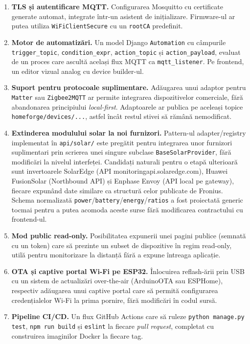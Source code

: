 \begin{enumerate}
    \item \textbf{TLS și autentificare MQTT.} Configurarea Mosquitto cu certificate generate automat, integrate într-un asistent de inițializare. Firmware-ul ar putea utiliza \texttt{WiFiClientSecure} cu un \texttt{rootCA} predefinit.
    \item \textbf{Motor de automatizări.} Un model Django \texttt{Automation} cu câmpurile \texttt{trigger\_topic}, \texttt{condition\_expr}, \texttt{action\_topic} și \texttt{action\_payload}, evaluat de un proces care ascultă același flux MQTT ca \texttt{mqtt\_listener}. Pe frontend, un editor vizual analog cu device builder-ul.
    \item \textbf{Suport pentru protocoale suplimentare.} Adăugarea unui adaptor pentru \texttt{Matter} sau \texttt{Zigbee2MQTT} ar permite integrarea dispozitivelor comerciale, fără abandonarea principiului \emph{local-first}. Adaptoarele ar publica pe aceleași topice \texttt{homeforge/devices/...}, astfel încât restul stivei să rămână nemodificat.
    \item \textbf{Extinderea modulului solar la noi furnizori.} Pattern-ul adapter/registry implementat în \texttt{api/solar/} este pregătit pentru integrarea unor furnizori suplimentari prin scrierea unei singure subclase \texttt{BaseSolarProvider}, fără modificări la nivelul interfeței. Candidați naturali pentru o etapă ulterioară sunt invertoarele SolarEdge (API monitoringapi.solaredge.com), Huawei FusionSolar (Northbound API) și Enphase Envoy (API local pe gateway), fiecare expunând date similare ca structură celor publicate de Fronius. Schema normalizată \texttt{power}/\texttt{battery}/\texttt{energy}/\texttt{ratios} a fost proiectată generic tocmai pentru a putea acomoda aceste surse fără modificarea contractului cu frontend-ul.
    \item \textbf{Mod public read-only.} Posibilitatea expunerii unei pagini publice (semnată cu un token) care să prezinte un subset de dispozitive în regim read-only, utilă pentru monitorizare la distanță fără a expune întreaga aplicație.
    \item \textbf{OTA și captive portal Wi-Fi pe ESP32.} Înlocuirea reflash-ării prin USB cu un sistem de actualizări over-the-air (ArduinoOTA sau ESPHome), respectiv adăugarea unui captive portal care să permită configurarea credențialelor Wi-Fi la prima pornire, fără modificări în codul sursă.
    \item \textbf{Pipeline CI/CD.} Un flux GitHub Actions care să ruleze \texttt{python manage.py test}, \texttt{npm run build} și \texttt{eslint} la fiecare \emph{pull request}, completat cu construirea imaginilor Docker la fiecare tag.
\end{enumerate}

